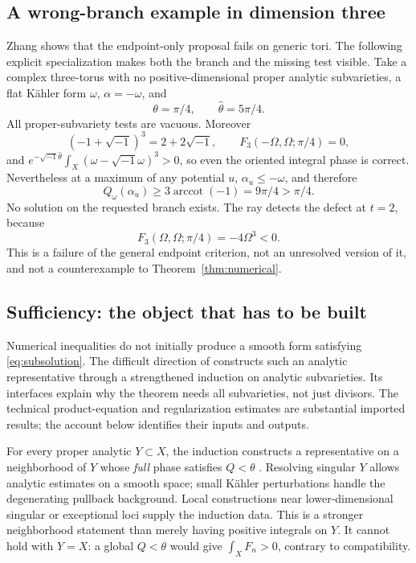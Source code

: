 \documentclass[12pt,reqno]{amsart}
\newcommand{\ii}{\sqrt{-1}}
\newcommand{\hth}{\widehat\theta}
\newcommand{\arccot}{\operatorname{arccot}}
\begin{document}
\subsection{A wrong-branch example in dimension three}
Zhang \cite{Zhang} shows that the endpoint-only proposal fails on generic tori. The following explicit specialization makes both the branch and the missing test visible. Take a complex three-torus with no positive-dimensional proper analytic subvarieties, a flat K\"ahler form $\omega$, $\alpha=-\omega$, and
\[
 \theta=\pi/4,\qquad \hth=5\pi/4.
\]
All proper-subvariety tests are vacuous. Moreover
\[
 (-1+\ii)^3=2+2\ii,\qquad
 F_3(-\Omega,\Omega;\pi/4)=0,
\]
and $e^{-\ii\hth}\int_X(\omega-\ii\omega)^3>0$, so even the oriented integral phase is correct. Nevertheless at a maximum of any potential $u$, $\alpha_u\leq-\omega$, and therefore
\[
 Q_\omega(\alpha_u)\geq3\arccot(-1)=9\pi/4>\pi/4.
\]
No solution on the requested branch exists. The ray detects the defect at $t=2$, because
\[
 F_3(\Omega,\Omega;\pi/4)=-4\Omega^3<0.
\]
This is a failure of the general endpoint criterion, not an unresolved version of it, and not a counterexample to Theorem~\ref{thm:numerical}.

\subsection{Sufficiency: the object that has to be built}
Numerical inequalities do not initially produce a smooth form satisfying \eqref{eq:subsolution}. The difficult direction of \cite{CLT} constructs such an analytic representative through a strengthened induction on analytic subvarieties. Its interfaces explain why the theorem needs all subvarieties, not just divisors. The technical product-equation and regularization estimates are substantial imported results; the account below identifies their inputs and outputs.

For every proper analytic $Y\subset X$, the induction constructs a representative on a neighborhood of $Y$ whose \emph{full} phase satisfies $Q<\theta$ \cite[Theorem 3.1]{CLT}. Resolving singular $Y$ allows analytic estimates on a smooth space; small K\"ahler perturbations handle the degenerating pullback background. Local constructions near lower-dimensional singular or exceptional loci supply the induction data. This is a stronger neighborhood statement than merely having positive integrals on $Y$. It cannot hold with $Y=X$: a global $Q<\theta$ would give $\int_XF_n>0$, contrary to compatibility.
\end{document}
